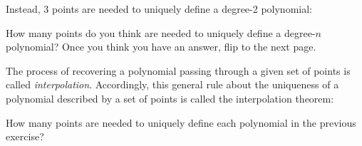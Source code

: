 Instead, 3 points are needed to uniquely define a degree-2 polynomial:

\begin{center}
\end{center}

How many points do you think are needed to uniquely define a degree-$n$
polynomial? Once you think you have an answer, flip to the next page.

\newpage
The process of recovering a polynomial passing through a given set of points is 
called \emph{interpolation}. Accordingly, this general rule about the 
uniqueness of a polynomial described by a set of points is called the 
interpolation theorem:

\setlength\fboxsep{1em}        
\begin{center}
\end{center}

\begin{exercise}
    How many points are needed to uniquely define each polynomial 
    in the previous exercise?
\end{exercise}

